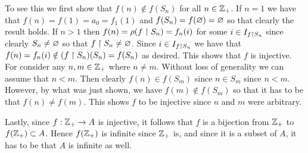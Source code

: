 {{    To see this we first show that $f(n) \notin f(S_n)$ for all $n \in {{\mathbb{Z}}_+}$.
    If $n = 1$ we have that $f(n) = f(1) = a_0 = f_1(1)$ and $f(S_n) = f(\varnothing) = \varnothing$ so that clearly the result holds.
    If $n > 1$ then $f(n) = \rho(f \restriction S_n) = f_n(i)$ for some $i \in I_{f \restriction S_n}$ since clearly $S_n \neq \varnothing$ so that $f \restriction S_n \neq \varnothing$.
    Since $i \in I_{f \restriction S_n}$ we have that $f(n) = f_n(i) \notin (f \restriction S_n)(S_n) = f(S_n)$ as desired.
    This shows that $f$ is injective.
    For consider any $n,m \in {{\mathbb{Z}}_+}$ where $n \neq m$.
    Without loss of generality we can assume that $n < m$.
    Then clearly $f(n) \in f(S_m)$ since $n \in S_m$ since $n < m$.
    However, by what was just shown, we have $f(m) \notin f(S_m)$ so that it has to be that $f(n) \neq f(m)$.
    This shows $f$ to be injective since $n$ and $m$ were arbitrary.

    Lastly, since $f: {{\mathbb{Z}}_+} \to A$ is injective, it follows that $f$ is a bijection from ${{\mathbb{Z}}_+}$ to $f({{\mathbb{Z}}_+}) \subset A$.
    Hence $f({{\mathbb{Z}}_+})$ is infinite since ${{\mathbb{Z}}_+}$ is, and since it is a subset of $A$, it has to be that $A$ is infinite as well.
  }
}

